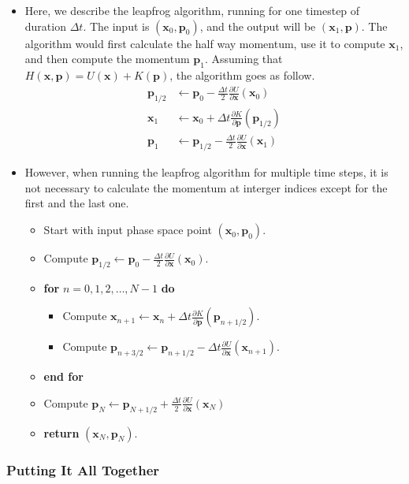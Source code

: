 \documentclass[10pt]{article}
\newcommand{\ve}[1]{\mathbf{#1}}
\begin{document}
\begin{itemize}
  \item Here, we describe the leapfrog algorithm, running for one timestep of duration $\Delta t$. The input is $(\ve{x}_0,\ve{p}_0)$, and the output will be $(\ve{x}_1,\ve{p})$. The algorithm would first calculate the half way momentum, use it to compute $\ve{x}_1$, and then compute the momentum $\ve{p}_1$. Assuming that $H(\ve{x},\ve{p}) = U(\ve{x}) + K(\ve{p})$, the algorithm goes as follow.
  \begin{align*}
    \ve{p}_{1/2} & \gets \ve{p}_0 - \frac{\Delta t}{2} \frac{\partial U}{\partial \ve{x}}(\ve{x}_0) \\
    \ve{x}_1 & \gets \ve{x}_0 + \Delta t \frac{\partial K}{\partial \ve{p}}(\ve{p}_{1/2}) \\
    \ve{p}_1 & \gets \ve{p}_{1/2} - \frac{\Delta t}{2} \frac{\partial U}{\partial \ve{x}}(\ve{x}_1)
  \end{align*}

  \item However, when running the leapfrog algorithm for multiple time steps, it is not necessary to calculate the momentum at interger indices except for the first and the last one.
  \begin{itemize}
    \item[] Start with input phase space point $(\ve{x}_0, \ve{p}_0)$.
    \item[] Compute $\ve{p}_{1/2} \gets \ve{p}_0 - \frac{\Delta t}{2} \frac{\partial U}{\partial \ve{x}}(\ve{x}_0)$.
    \item[] {\bf for} $n = 0, 1, 2, \dotsc, N-1$ {\bf do}
    \begin{itemize}
      \item[] Compute $\ve{x}_{n+1} \gets \ve{x}_n + \Delta t \frac{\partial K}{\partial \ve{p}}(\ve{p}_{n+1/2}).$
      \item[] Compute $\ve{p}_{n+3/2} \gets \ve{p}_{n+1/2} - \Delta t \frac{\partial U}{\partial \ve{x}}(\ve{x}_{n+1}).$
    \end{itemize}
    \item[] {\bf end for}
    \item[] Compute $\ve{p}_N \gets \ve{p}_{N+1/2} + \frac{\Delta t}{2} \frac{\partial U}{\partial \ve{x}}(\ve{x}_{N})$
    \item[] {\bf return} $(\ve{x}_N, \ve{p}_N)$.
  \end{itemize}
\end{itemize}

\subsubsection{Putting It All Together}
\end{document}
